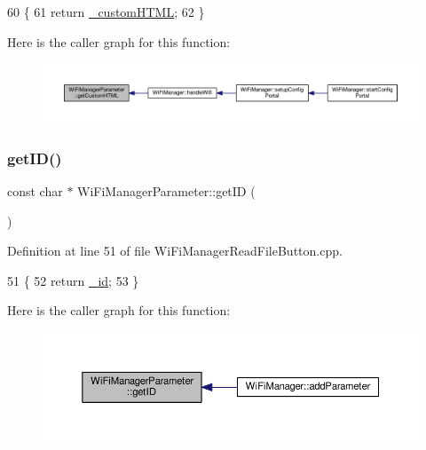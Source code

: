 \begin{DoxyCode}
60                                                 \{
61   \textcolor{keywordflow}{return} \hyperlink{class_wi_fi_manager_parameter_a3823cb117da1a75860cc3e81b0c6f80d}{\_customHTML};
62 \}
\end{DoxyCode}
Here is the caller graph for this function\+:\nopagebreak
\begin{figure}[H]
\begin{center}
\leavevmode
\includegraphics[width=350pt]{d7/d08/class_wi_fi_manager_parameter_a596273c189eb40107500cee3ad31b13b_icgraph}
\end{center}
\end{figure}
\mbox{\label{class_wi_fi_manager_parameter_af57919615418fff788310ba9cc2664d8}} 
\subsubsection{\texorpdfstring{get\+I\+D()}{getID()}}
{\footnotesize\ttfamily const char $\ast$ Wi\+Fi\+Manager\+Parameter\+::get\+ID (\begin{DoxyParamCaption}{ }\end{DoxyParamCaption})}



Definition at line 51 of file Wi\+Fi\+Manager\+Read\+File\+Button.\+cpp.


\begin{DoxyCode}
51                                         \{
52   \textcolor{keywordflow}{return} \hyperlink{class_wi_fi_manager_parameter_a2b468d83df6e0714c18a38f09e7996ed}{\_id};
53 \}
\end{DoxyCode}
Here is the caller graph for this function\+:\nopagebreak
\begin{figure}[H]
\begin{center}
\leavevmode
\includegraphics[width=350pt]{d7/d08/class_wi_fi_manager_parameter_af57919615418fff788310ba9cc2664d8_icgraph}
\end{center}
\end{figure}
\mbox{\label{class_wi_fi_manager_parameter_a69124c6f46876d1ede54177c692e3382}} 
